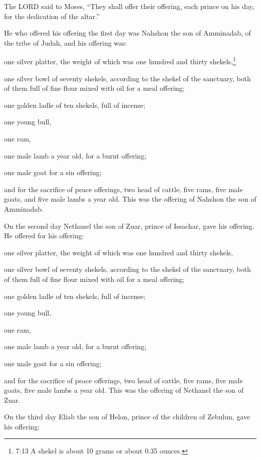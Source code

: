 The LORD said to Moses, ``They shall offer their offering,
each prince on his day, for the dedication of the altar.''

 He who offered his offering the first day was Nahshon the
son of Amminadab, of the tribe of Judah,  and his offering
was:

one silver platter, the weight of which was one hundred and thirty
shekels,\footnote{7:13 A shekel is about 10 grams or about 0.35 ounces.}

one silver bowl of seventy shekels, according to the shekel of the
sanctuary, both of them full of fine flour mixed with oil for a meal
offering;

 one golden ladle of ten shekels, full of incense;

 one young bull,

one ram,

one male lamb a year old, for a burnt offering;

 one male goat for a sin offering;

 and for the sacrifice of peace offerings, two head of
cattle, five rams, five male goats, and five male lambs a year old. This
was the offering of Nahshon the son of Amminadab.

 On the second day Nethanel the son of Zuar, prince of
Issachar, gave his offering.  He offered for his offering:

one silver platter, the weight of which was one hundred and thirty
shekels,

one silver bowl of seventy shekels, according to the shekel of the
sanctuary, both of them full of fine flour mixed with oil for a meal
offering;

 one golden ladle of ten shekels, full of incense;

 one young bull,

one ram,

one male lamb a year old, for a burnt offering;

 one male goat for a sin offering;

 and for the sacrifice of peace offerings, two head of
cattle, five rams, five male goats, five male lambs a year old. This was
the offering of Nethanel the son of Zuar.

 On the third day Eliab the son of Helon, prince of the
children of Zebulun,  gave his offering:

